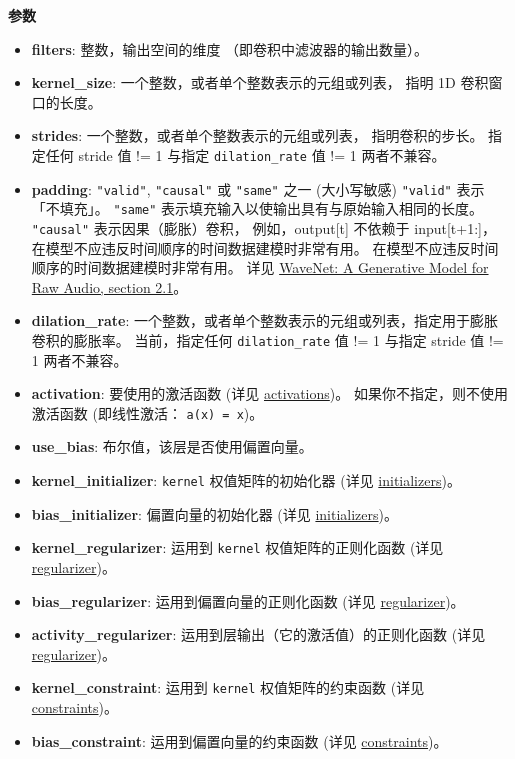 \textbf{参数}

\begin{itemize}
\tightlist
\item
  \textbf{filters}: 整数，输出空间的维度 （即卷积中滤波器的输出数量）。
\item
  \textbf{kernel\_size}: 一个整数，或者单个整数表示的元组或列表， 指明
  1D 卷积窗口的长度。
\item
  \textbf{strides}: 一个整数，或者单个整数表示的元组或列表，
  指明卷积的步长。 指定任何 stride 值 != 1 与指定
  \texttt{dilation\_rate} 值 != 1 两者不兼容。
\item
  \textbf{padding}: \texttt{"valid"}, \texttt{"causal"} 或
  \texttt{"same"} 之一 (大小写敏感) \texttt{"valid"} 表示「不填充」。
  \texttt{"same"} 表示填充输入以使输出具有与原始输入相同的长度。
  \texttt{"causal"} 表示因果（膨胀）卷积， 例如，output{[}t{]} 不依赖于
  input{[}t+1:{]}， 在模型不应违反时间顺序的时间数据建模时非常有用。
  在模型不应违反时间顺序的时间数据建模时非常有用。 详见
  \href{https://arxiv.org/abs/1609.03499}{WaveNet: A Generative Model
  for Raw Audio, section 2.1}。
\item
  \textbf{dilation\_rate}:
  一个整数，或者单个整数表示的元组或列表，指定用于膨胀卷积的膨胀率。
  当前，指定任何 \texttt{dilation\_rate} 值 != 1 与指定 stride 值 != 1
  两者不兼容。
\item
  \textbf{activation}: 要使用的激活函数 (详见
  \hyperref[activations]{activations})。
  如果你不指定，则不使用激活函数 (即线性激活： \texttt{a(x)\ =\ x})。
\item
  \textbf{use\_bias}: 布尔值，该层是否使用偏置向量。
\item
  \textbf{kernel\_initializer}: \texttt{kernel} 权值矩阵的初始化器 (详见
  \hyperref[initializers]{initializers})。
\item
  \textbf{bias\_initializer}: 偏置向量的初始化器 (详见
  \hyperref[initializers]{initializers})。
\item
  \textbf{kernel\_regularizer}: 运用到 \texttt{kernel}
  权值矩阵的正则化函数 (详见 \hyperref[regularizers]{regularizer})。
\item
  \textbf{bias\_regularizer}: 运用到偏置向量的正则化函数 (详见
  \hyperref[regularizers]{regularizer})。
\item
  \textbf{activity\_regularizer}: 运用到层输出（它的激活值）的正则化函数
  (详见 \hyperref[regularizers]{regularizer})。
\item
  \textbf{kernel\_constraint}: 运用到 \texttt{kernel} 权值矩阵的约束函数
  (详见 \hyperref[constraints]{constraints})。
\item
  \textbf{bias\_constraint}: 运用到偏置向量的约束函数 (详见
  \hyperref[constraints]{constraints})。
\end{itemize}

